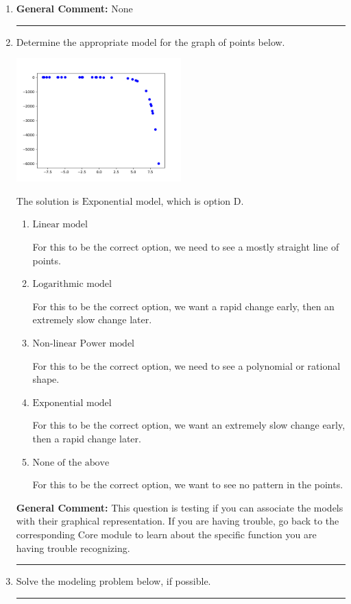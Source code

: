\documentclass{extbook}[14pt]
\newcommand{\litem}[1]{\item #1

\rule{\textwidth}{0.4pt}}
\begin{document}
\begin{enumerate}\litem{


\textbf{General Comment:} None
}
\litem{
Determine the appropriate model for the graph of points below.

\begin{center}
    \includegraphics[width=0.5\textwidth]{../Figures/identifyModelGraph12C.png}
\end{center}


The solution is \( \text{Exponential model} \), which is option D.\begin{enumerate}[label=\Alph*.]
\item \( \text{Linear model} \)

For this to be the correct option, we need to see a mostly straight line of points.
\item \( \text{Logarithmic model} \)

For this to be the correct option, we want a rapid change early, then an extremely slow change later.
\item \( \text{Non-linear Power model} \)

For this to be the correct option, we need to see a polynomial or rational shape.
\item \( \text{Exponential model} \)

For this to be the correct option, we want an extremely slow change early, then a rapid change later.
\item \( \text{None of the above} \)

For this to be the correct option, we want to see no pattern in the points.
\end{enumerate}

\textbf{General Comment:} This question is testing if you can associate the models with their graphical representation. If you are having trouble, go back to the corresponding Core module to learn about the specific function you are having trouble recognizing.
}
\litem{
Solve the modeling problem below, if possible.

}
\end{enumerate}
\end{document}
